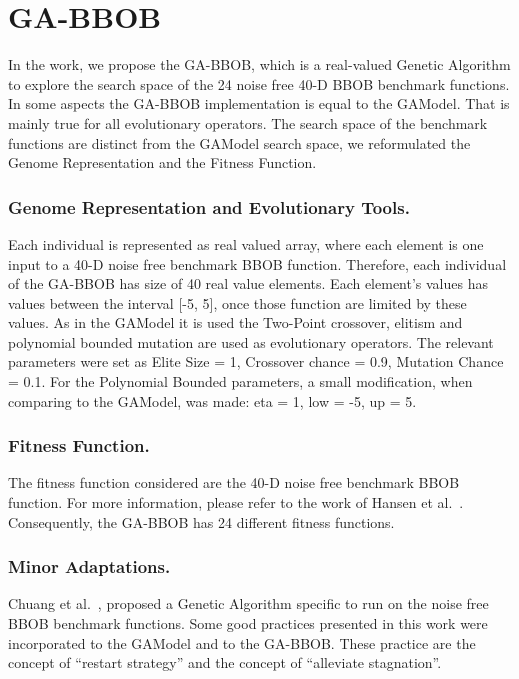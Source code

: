 \section{GA-BBOB}\label{sec:proposed:ga-bbob}

In the work, we propose the GA-BBOB, which is a real-valued Genetic Algorithm to explore the search space of the 24 noise free 40-D BBOB benchmark functions. In some aspects the GA-BBOB implementation is equal to the GAModel. That is mainly true for all evolutionary operators. The search space of the benchmark functions are distinct from the GAModel search space, we reformulated the Genome Representation and the Fitness Function.

\subsubsection*{Genome Representation and Evolutionary Tools.}
Each individual is represented as real valued array, where each element is one input to a 40-D noise free benchmark BBOB function. Therefore, each individual of the GA-BBOB has size of 40 real value elements. Each element's values has values between the interval [-5, 5], once those function are limited by these values. As in the GAModel it is used the Two-Point crossover, elitism and polynomial bounded mutation are used as evolutionary operators. The relevant parameters were set as Elite Size = 1, Crossover chance = 0.9, Mutation Chance = 0.1. For the Polynomial Bounded parameters, a small modification, when comparing to the GAModel, was made: eta = 1, low = -5, up = 5.


\subsubsection*{Fitness Function.}
The fitness function considered are the 40-D noise free benchmark BBOB function. For more information, please refer to the work of Hansen et al.~\cite{hansen2010real}.
Consequently, the GA-BBOB has 24 different fitness functions. 


\subsubsection*{Minor Adaptations.}
Chuang et al.~\cite{chuang2012black}, proposed a Genetic Algorithm specific to run on the noise free BBOB benchmark functions. Some good practices presented in this work were incorporated to the GAModel and to the GA-BBOB. These practice are the concept of ``restart strategy'' and the concept of ``alleviate stagnation''.

